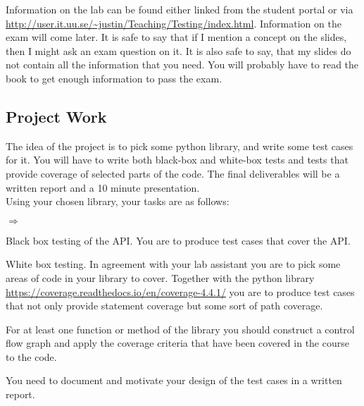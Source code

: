 \documentclass[a4page]{article}
\begin{document}
  Information on the lab can be found either linked from the student portal or
  via
  \url{http://user.it.uu.se/~justin/Teaching/Testing/index.html}. Information
  on the exam will come later. It is safe to say that if I mention a concept
  on the slides, then I might ask an exam question on it. It is also safe to
  say, that my slides do not contain all the information that you need. You
  will probably have to read the book to get enough information to pass the
  exam.

\subsection{Project Work}

The idea of the project is to pick some python library, and write some
test cases for it. You will have to write both black-box and white-box
tests and tests that provide coverage of selected parts of the
code. The final deliverables will be a written report and a 10 minute
presentation.\\

Using your chosen library, your tasks are as follows:
\begin{list}{$\Rightarrow$}{} 
    \item  Black box testing of the API. You are to produce test cases
      that cover the API.
    \item  White box testing. In agreement with your lab assistant you
      are to pick some areas of code in your library to cover. Together with
      the python library
      \url{https://coverage.readthedocs.io/en/coverage-4.4.1/} you are
      to produce test cases that not only provide statement coverage
      but some sort of path coverage. 
    \item For at least one function or method of the library you
      should construct a control flow graph and apply the coverage criteria
      that have been covered in the course to the code.
    \item You need to document and motivate your design of the test cases in
      a written report. 
\end{list}
\end{document}
